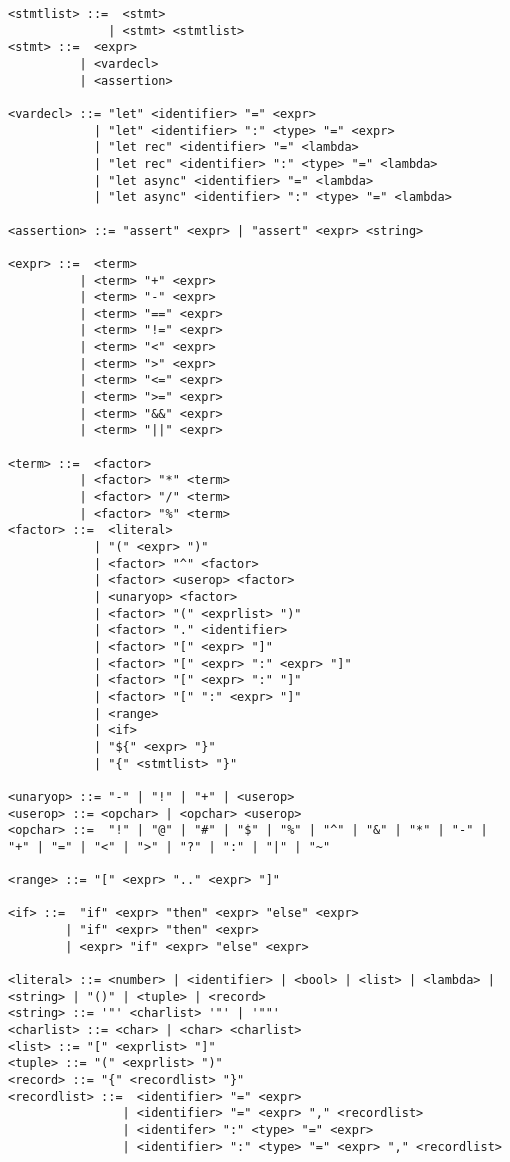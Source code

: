 \begin{verbatim}
<stmtlist> ::=  <stmt> 
              | <stmt> <stmtlist>
<stmt> ::=  <expr> 
          | <vardecl>
          | <assertion>

<vardecl> ::= "let" <identifier> "=" <expr>
            | "let" <identifier> ":" <type> "=" <expr>
            | "let rec" <identifier> "=" <lambda>
            | "let rec" <identifier> ":" <type> "=" <lambda>
            | "let async" <identifier> "=" <lambda>
            | "let async" <identifier> ":" <type> "=" <lambda>

<assertion> ::= "assert" <expr> | "assert" <expr> <string>

<expr> ::=  <term> 
          | <term> "+" <expr> 
          | <term> "-" <expr>
          | <term> "==" <expr>
          | <term> "!=" <expr>
          | <term> "<" <expr>
          | <term> ">" <expr>
          | <term> "<=" <expr>
          | <term> ">=" <expr>
          | <term> "&&" <expr>
          | <term> "||" <expr>
            
<term> ::=  <factor> 
          | <factor> "*" <term> 
          | <factor> "/" <term> 
          | <factor> "%" <term> 
<factor> ::=  <literal> 
            | "(" <expr> ")" 
            | <factor> "^" <factor>
            | <factor> <userop> <factor>
            | <unaryop> <factor>
            | <factor> "(" <exprlist> ")"
            | <factor> "." <identifier>
            | <factor> "[" <expr> "]"
            | <factor> "[" <expr> ":" <expr> "]"
            | <factor> "[" <expr> ":" "]"
            | <factor> "[" ":" <expr> "]"
            | <range>
            | <if>
            | "${" <expr> "}"
            | "{" <stmtlist> "}"

<unaryop> ::= "-" | "!" | "+" | <userop>
<userop> ::= <opchar> | <opchar> <userop>
<opchar> ::=  "!" | "@" | "#" | "$" | "%" | "^" | "&" | "*" | "-" | "+" | "=" | "<" | ">" | "?" | ":" | "|" | "~"

<range> ::= "[" <expr> ".." <expr> "]"

<if> ::=  "if" <expr> "then" <expr> "else" <expr>
        | "if" <expr> "then" <expr>
        | <expr> "if" <expr> "else" <expr>

<literal> ::= <number> | <identifier> | <bool> | <list> | <lambda> | <string> | "()" | <tuple> | <record>
<string> ::= '"' <charlist> '"' | '""'
<charlist> ::= <char> | <char> <charlist>
<list> ::= "[" <exprlist> "]"
<tuple> ::= "(" <exprlist> ")"
<record> ::= "{" <recordlist> "}"
<recordlist> ::=  <identifier> "=" <expr> 
                | <identifier> "=" <expr> "," <recordlist>
                | <identifer> ":" <type> "=" <expr> 
                | <identifier> ":" <type> "=" <expr> "," <recordlist>


\end{verbatim}
